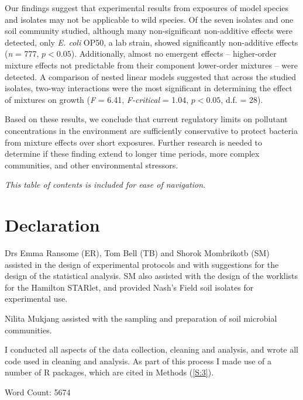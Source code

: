 \documentclass[10pt]{article}
\begin{document}
Our findings suggest that experimental results from exposures of model species and isolates may not be applicable to wild species. Of the seven isolates and one soil community studied, although many non-significant non-additive effects were detected, only \textit{E. coli} OP50, a lab strain, showed significantly non-additive effects (\textit{n} = 777, $p < 0.05$). Additionally, almost no emergent effects -- higher-order mixture effects not predictable from their component lower-order mixtures -- were detected. A comparison of nested linear models suggested that across the studied isolates, two-way interactions were the most significant in determining the effect of mixtures on growth (\textit{F} = 6.41, \textit{F-critical} = 1.04, $p < 0.05$, d.f. = 28).  

Based on these results, we conclude that current regulatory limits on pollutant concentrations in the environment are sufficiently conservative to protect bacteria from mixture effects over short exposures. Further research is needed to determine if these finding extend to longer time periods, more complex communities, and other environmental stressors.

\newpage

\begin{spacing}{0.01}
\tableofcontents
\end{spacing}
\vspace{0.5cm}
\textit{This table of contents is included for ease of navigation.}

\newpage

\section*{Declaration} 

Drs Emma Ransome (ER), Tom Bell (TB) and Shorok Mombrikotb (SM) assisted in the design of experimental protocols and with suggestions for the design of the statistical analysis. SM also assisted with the design of the worklists for the Hamilton STARlet, and provided Nash's Field soil isolates for experimental use.

Nilita Mukjang assisted with the sampling and preparation of soil microbial communities.

I conducted all aspects of the data collection, cleaning and analysis, and wrote all code used in cleaning and analysis. As part of this process I made use of a number of R packages, which are cited in Methods (\cref{S:3}).

Word Count: 5674
\end{document}
